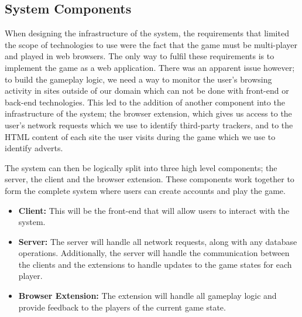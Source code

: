 \documentclass{l4proj}
\begin{document}
\subsection{System Components}
When designing the infrastructure of the system, the requirements that limited the scope of technologies to use were the fact that the game must be multi-player and played in web browsers. The only way to fulfil these requirements is to implement the game as a web application. There was an apparent issue however; to build the gameplay logic, we need a way to monitor the user's browsing activity in sites outside of our domain which can not be done with front-end or back-end technologies. This led to the addition of another component into the infrastructure of the system; the browser extension, which gives us access to the user's network requests which we use to identify third-party trackers, and to the HTML content of each site the user visits during the game which we use to identify adverts.

The system can then be logically split into three high level components; the server, the client and the browser extension. These components work together to form the complete system where users can create accounts and play the game.
\begin{itemize}
    \item
    \textbf{Client:} This will be the front-end that will allow users to interact with the system.
    \item
    \textbf{Server:} The server will handle all network requests, along with any database operations. Additionally, the server will handle the communication between the clients and the extensions to handle updates to the game states for each player.
    \item
    \textbf{Browser Extension:} The extension will handle all gameplay logic and provide feedback to the players of the current game state.
\end{itemize}
\end{document}
